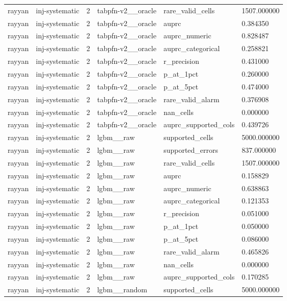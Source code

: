 \begin{tabular}{llllll}
rayyan & inj-systematic & 2 & tabpfn-v2\_\_oracle & rare\_valid\_cells & 1507.000000 \\
rayyan & inj-systematic & 2 & tabpfn-v2\_\_oracle & auprc & 0.384350 \\
rayyan & inj-systematic & 2 & tabpfn-v2\_\_oracle & auprc\_numeric & 0.828487 \\
rayyan & inj-systematic & 2 & tabpfn-v2\_\_oracle & auprc\_categorical & 0.258821 \\
rayyan & inj-systematic & 2 & tabpfn-v2\_\_oracle & r\_precision & 0.431000 \\
rayyan & inj-systematic & 2 & tabpfn-v2\_\_oracle & p\_at\_1pct & 0.260000 \\
rayyan & inj-systematic & 2 & tabpfn-v2\_\_oracle & p\_at\_5pct & 0.474000 \\
rayyan & inj-systematic & 2 & tabpfn-v2\_\_oracle & rare\_valid\_alarm & 0.376908 \\
rayyan & inj-systematic & 2 & tabpfn-v2\_\_oracle & nan\_cells & 0.000000 \\
rayyan & inj-systematic & 2 & tabpfn-v2\_\_oracle & auprc\_supported\_cols & 0.439726 \\
rayyan & inj-systematic & 2 & lgbm\_\_raw & supported\_cells & 5000.000000 \\
rayyan & inj-systematic & 2 & lgbm\_\_raw & supported\_errors & 837.000000 \\
rayyan & inj-systematic & 2 & lgbm\_\_raw & rare\_valid\_cells & 1507.000000 \\
rayyan & inj-systematic & 2 & lgbm\_\_raw & auprc & 0.158829 \\
rayyan & inj-systematic & 2 & lgbm\_\_raw & auprc\_numeric & 0.638863 \\
rayyan & inj-systematic & 2 & lgbm\_\_raw & auprc\_categorical & 0.121353 \\
rayyan & inj-systematic & 2 & lgbm\_\_raw & r\_precision & 0.051000 \\
rayyan & inj-systematic & 2 & lgbm\_\_raw & p\_at\_1pct & 0.050000 \\
rayyan & inj-systematic & 2 & lgbm\_\_raw & p\_at\_5pct & 0.086000 \\
rayyan & inj-systematic & 2 & lgbm\_\_raw & rare\_valid\_alarm & 0.465826 \\
rayyan & inj-systematic & 2 & lgbm\_\_raw & nan\_cells & 0.000000 \\
rayyan & inj-systematic & 2 & lgbm\_\_raw & auprc\_supported\_cols & 0.170285 \\
rayyan & inj-systematic & 2 & lgbm\_\_random & supported\_cells & 5000.000000 \\

\end{tabular}

